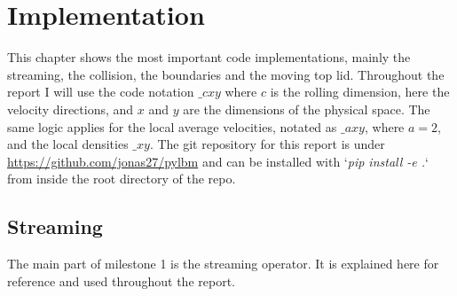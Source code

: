 \chapter{Implementation}
This chapter shows the most important code implementations, mainly the streaming, the collision, the boundaries and the moving top lid.
Throughout the report I will use the code notation $\_cxy$ where $c$ is the rolling dimension, here the velocity directions, and $x$ and $y$ are the dimensions of the physical space. The same logic applies for the local average velocities, notated as $\_axy$, where $a=2$, and the local densities $\_xy$.
The git repository for this report is under \href{https://github.com/jonas27/pylbm}{https://github.com/jonas27/pylbm} and can be installed with `\textit{pip install -e .}` from inside the root directory of the repo.

\section{Streaming}
The main part of milestone 1 is the streaming operator. It is explained here for reference and used throughout the report. 

